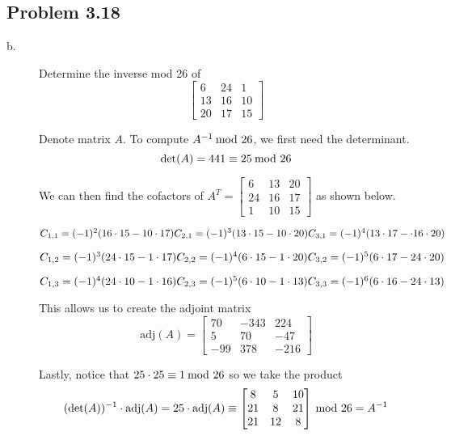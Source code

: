 \documentclass[../hw_sols.tex]{subfiles}
\begin{document}
\subsection*{Problem 3.18}

\begin{description}

\item[b.] Determine the inverse mod 26 of
	\[ \begin{bmatrix}
		6  & 24 &  1 \\ 
		13 & 16 & 10 \\ 
		20 & 17 & 15
	\end{bmatrix} \]

\begin{solution}

Denote matrix $A$. To compute $A^{-1} \tmod{26}$, we first need the 
determinant.
	\[ \det(A) = 441 \equiv 25 \tmod{26} \]

We can then find the cofactors of 
$A^T = 
\begin{bmatrix}
	 6 & 13 & 20 \\ 
	24 & 16 & 17 \\ 
	 1 & 10 & 15
\end{bmatrix}$
as shown below.

\begin{multicols}{3}
	$C_{1,1} = (-1)^2(16 \cdot 15 - 10 \cdot 17) \\
	 C_{2,1} = (-1)^3(13 \cdot 15 - 10 \cdot 20)  \\
	 C_{3,1} = (-1)^4(13 \cdot 17 - \cdot 16 \cdot 20)$
	
	$C_{1,2} = (-1)^3(24 \cdot 15 - 1 \cdot 17) \\
	 C_{2,2} = (-1)^4(6 \cdot 15 - 1 \cdot 20)   \\
	 C_{3,2} = (-1)^5(6 \cdot 17 - 24 \cdot 20)$
	
	$C_{1,3} = (-1)^4(24 \cdot 10 - 1 \cdot 16) \\
	 C_{2,3} = (-1)^5(6 \cdot 10 - 1 \cdot 13)   \\
	 C_{3,3} = (-1)^6(6 \cdot 16 - 24 \cdot 13)$
\end{multicols}

This allows us to create the adjoint matrix
	\[ \text{adj}(A) =
	\begin{bmatrix}
		 70 & -343 &  224 \\ 
		  5 &   70 &  -47 \\ 
		-99 &  378 & -216
	\end{bmatrix} \]

Lastly, notice that $25 \cdot 25 \equiv 1 \tmod{26}$ so we take the product
	\[ (\det(A))^{-1} \cdot \text{adj}(A) 
	= 25 \cdot \text{adj}(A) 
	\equiv 
	\begin{bmatrix}
		 8 &  5 & 10 \\ 
		21 &  8 & 21 \\ 
		21 & 12 & 8
	\end{bmatrix} \tmod{26} 
	= A^{-1} \]

\end{solution}

\end{description}
\end{document}
